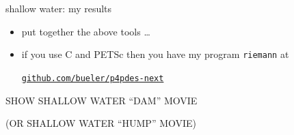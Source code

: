 \documentclass[10pt,dvipsnames,usepdftitle=false,
hyperref={pdftitle = {Finite volume methods},
    pdfauthor = {Ed Bueler}}]{beamer}
\begin{document}
\begin{frame}{shallow water: my results}

\begin{itemize}
\item put together the above tools \dots
\item if you use C and PETSc then you have my program \texttt{riemann} at
    \begin{center}
    \href{https://github.com/bueler/p4pdes-next}{\texttt{github.com/bueler/p4pdes-next}}
    \end{center}
\end{itemize}

\vspace{10mm}
\begin{center}
\alert{SHOW SHALLOW WATER ``DAM'' MOVIE}


\bigskip
\alert{(OR SHALLOW WATER ``HUMP'' MOVIE)}

\end{center}
\end{frame}
\end{document}
